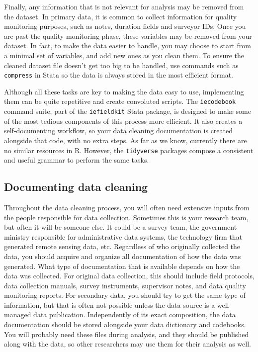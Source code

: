 Finally, any information that is not relevant for analysis may be removed from the dataset.
In primary data, it is common to collect information for quality monitoring purposes,
such as notes, duration fields and surveyor IDs.
Once you are past the quality monitoring phase,
these variables may be removed from your dataset.
In fact, to make the data easier to handle,
you may choose to start from a minimal set of variables,
and add new ones as you clean them.
To ensure the cleaned dataset file doesn't get too big to be handled,
use commands such as \texttt{compress} in Stata so the data
is always stored in the most efficient format.

Although all these tasks are key to making the data easy to use,
implementing them can be quite repetitive and create convoluted scripts.
The \texttt{iecodebook} command suite, part of the \texttt{iefieldkit} Stata package,
is designed to make some of the most tedious components of this process more efficient.
It also creates a self-documenting workflow,
so your data cleaning documentation is created alongside that code,
with no extra steps.
As far as we know, currently there are no similar resources in R.
However, the \texttt{tidyverse} packages
compose a consistent and useful grammar to perform the same tasks.

\subsection{Documenting data cleaning}

Throughout the data cleaning process,
you will often need extensive inputs from the people responsible for data collection.
Sometimes this is your research team, but often it will be someone else.
It could be a survey team, the government ministry responsible for administrative data systems,
the technology firm that generated remote sensing data, etc.
Regardless of who originally collected the data,
you should acquire and organize all documentation of how the data was generated.
What type of documentation that is available depends on how the data was collected.
For original data collection, this should include
field protocols, data collection manuals, survey instruments,
supervisor notes, and data quality monitoring reports.
For secondary data, you should try to get the same type of information,
but that is often not possible unless
the data source is a well managed data publication.
Independently of its exact composition,
the data documentation should be stored
alongside your data dictionary and codebooks.
You will probably need these files during analysis,
and they should be published along with the data,
so other researchers may use them for their analysis as well.

